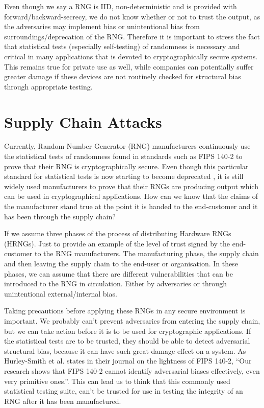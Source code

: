 \documentclass[]{final_report}
\begin{document}
\par{Even though we say a RNG is IID, non-deterministic and is provided with forward/backward-secrecy, we do not know whether or not to trust the output, as the adversaries may implement bias or unintentional bias from surroundings/deprecation of the RNG. Therefore it is important to stress the fact that statistical tests (especially self-testing) of randomness is necessary and critical in many applications that is devoted to cryptographically secure systems. This remains true for private use as well, while companies can potentially suffer greater damage if these devices are not routinely checked for structural bias through appropriate testing.}

\newpage
\section*{Supply Chain Attacks} 
\label{SupplyChainAttacksReport}

\par{Currently, Random Number Generator (RNG) manufacturers continuously use the statistical tests of randomness found in standards such as FIPS 140-2 to prove that their RNG is cryptographically secure. Even though this particular standard for statistical tests is now starting to become deprecated \cite{NIST:2019}, it is still widely used manufacturers to prove that their RNGs are producing output which can be used in cryptographical applications. How can we know that the claims of the manufacturer stand true at the point it is handed to the end-customer and it has been through the supply chain?}

\par{If we assume three phases of the process of distributing Hardware RNGs (HRNGs). Just to provide an example of the level of trust signed by the end-customer to the RNG manufacturers. The manufacturing phase, the supply chain and then leaving the supply chain to the end-user or organisation. In these phases, we can assume that there are different vulnerabilities that can be introduced to the RNG in circulation. Either by adversaries or through unintentional external/internal bias.}

\par{Taking precautions before applying these RNGs in any secure environment is important. We probably can't prevent adversaries from entering the supply chain, but we can take action before it is to be used for cryptographic applications.  If the statistical tests are to be trusted, they should be able to detect adversarial structural bias, because it can have such great damage effect on a system. As Hurley-Smith et al. \cite{Smith:2020} states in their journal on the lightness of FIPS 140-2, “Our research shows that FIPS 140-2 cannot identify adversarial biases effectively, even very primitive ones.”. This can lead us to think that this commonly used statistical testing suite, can’t be trusted for use in testing the integrity of an RNG after it has been manufactured.}
\end{document}
